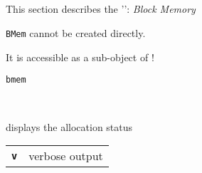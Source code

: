 
\subsection{}

This section describes the '': \textsl{Block Memory}

\begin{description}
\vspace{3mm}  \item[Creation:] \texttt{BMem} cannot be created directly.\

It is accessible as a sub-object of !

\vspace{3mm} \item[Methods:] \texttt{bmem}

    \begin{description}
       \texttt{ } \

        displays the allocation status

      \begin{tabular}{ll}
 \texttt{\textbf{v}} &    verbose output  \\
      \end{tabular}
    \end{description}

\end{description}

